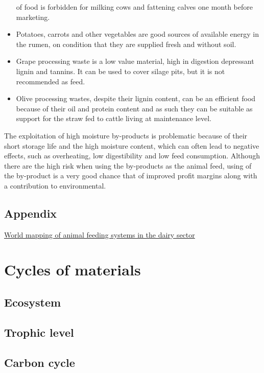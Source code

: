 \documentclass[]{book}
\begin{document}
\begin{itemize}
  of food is forbidden for milking cows and fattening calves one month
  before marketing.
\item
  Potatoes, carrots and other vegetables are good sources of available
  energy in the rumen, on condition that they are supplied fresh and
  without soil.
\item
  Grape processing waste is a low value material, high in digestion
  depressant lignin and tannins. It can be used to cover silage pits,
  but it is not recommended as feed.
\item
  Olive processing wastes, despite their lignin content, can be an
  efficient food because of their oil and protein content and as such
  they can be suitable as support for the straw fed to cattle living at
  maintenance level.
\end{itemize}

The exploitation of high moisture by-products is problematic because of
their short storage life and the high moisture content, which can often
lead to negative effects, such as overheating, low digestibility and low
feed consumption. Although there are the high risk when using the
by-products as the animal feed, using of the by-product is a very good
chance that of improved profit margins along with a contribution to
environmental.

\section{Appendix}\label{appendix-3}

\href{http://www.fao.org/3/a-i3913e.pdf}{World mapping of animal feeding
systems in the dairy sector}

\chapter{Cycles of materials}\label{cycles-of-materials}

\section{Ecosystem}\label{ecosystem}

\section{Trophic level}\label{trophic-level}

\section{Carbon cycle}\label{carbon-cycle}
\end{document}

